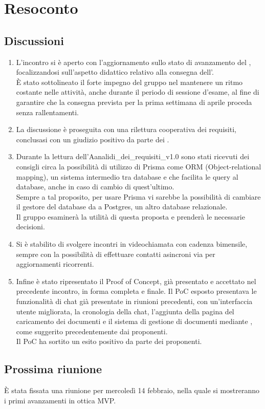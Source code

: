 \section{Resoconto} \label{sec:resoconto}
\subsection{Discussioni} \label{subsec:resdiscussione}
\begin{enumerate}
    \item L'incontro si è aperto con l'aggiornamento sullo stato di avanzamento del , focalizzandosi sull'aspetto didattico relativo alla consegna dell'. \\È stato sottolineato il forte impegno del gruppo nel mantenere un ritmo costante nelle attività, anche durante il periodo di sessione d'esame, al fine di garantire che la consegna prevista per la prima settimana di aprile proceda senza rallentamenti.
    
    \item La discussione è proseguita con una rilettura cooperativa dei requisiti, conclusasi con un giudizio positivo da parte dei .
    
    \item Durante la lettura dell'Aanalidi\_dei\_requisiti\_v1.0 sono stati ricevuti dei consigli circa la possibilità di utilizzo di Prisma come ORM (Object-relational mapping), un sistema intermedio tra database e  che facilita le query al database, anche in caso di cambio di quest'ultimo. \\Sempre a tal proposito, per usare Prisma vi sarebbe la possibilità di cambiare il gestore del database da  a Postgres, un altro database relazionale. \\Il gruppo esaminerà la utilità di questa proposta e prenderà le necessarie decisioni.
    \item Si è stabilito di svolgere incontri in videochiamata con cadenza bimensile, sempre con la possibilità di effettuare contatti asincroni via  per aggiornamenti ricorrenti.
    
    \item Infine è stato ripresentato il Proof of Concept, già presentato e accettato nel precedente incontro, in forma completa e finale. Il PoC esposto presentava le funzionalità di chat già presentate in riunioni precedenti, con un'interfaccia utente migliorata, la cronologia della chat, l'aggiunta della pagina del caricamento dei documenti e il sistema di gestione di documenti mediante , come suggerito precedentemente dai proponenti.\\
    Il PoC ha sortito un esito positivo da parte dei proponenti.
\end{enumerate}

\subsection{Prossima riunione} \label{subsec:riunione}
È stata fissata una riunione per mercoledì 14 febbraio, nella quale si mostreranno i primi avanzamenti in ottica MVP.
